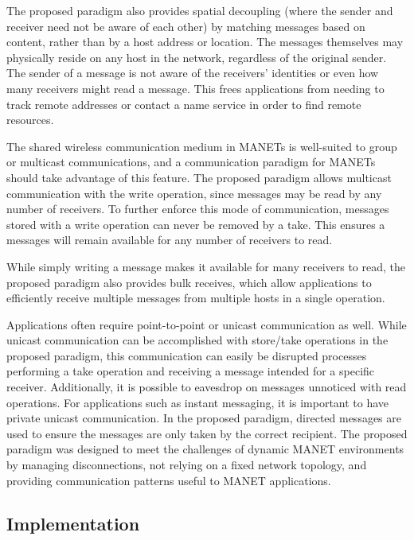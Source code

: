 \documentclass[lnicst]{svmultln}
\begin{document}
The proposed paradigm also provides spatial decoupling (where the sender and receiver need not be aware of each other) by matching messages based on content, rather than by a host address or location. The messages themselves may physically reside on any host in the network, regardless of the original sender. The sender of a message is not aware of the receivers’ identities or even how many receivers might read a message. This frees applications from needing to track remote addresses or contact a name service in order to find remote resources.

 The shared wireless communication medium in MANETs is well-suited to group or multicast communications, and a communication paradigm for MANETs should take advantage of this feature. The proposed paradigm allows multicast communication with the write operation, since messages may be read by any number of receivers. To further enforce this mode of communication, messages stored with a write operation can never be removed by a take. This ensures a messages will remain available for any number of receivers to read.

While simply writing a message makes it available for many receivers to read, the proposed paradigm also provides bulk receives, which allow applications to efficiently receive multiple messages from multiple hosts in a single operation.

Applications often require point-to-point or unicast communication as well. While unicast communication can be accomplished with store/take operations in the proposed paradigm, this communication can easily be disrupted processes performing a take operation and receiving a message intended for a specific receiver. Additionally, it is possible to eavesdrop on messages unnoticed with read operations. For applications such as instant messaging, it is important to have private unicast communication. In the proposed paradigm, directed messages are used to ensure the messages are only taken by the correct recipient.
The proposed paradigm was designed to meet the challenges of dynamic MANET environments by managing disconnections, not relying on a fixed network topology, and providing communication patterns useful to MANET applications.
    
\subsection{Implementation}
\end{document}
